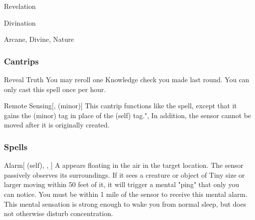 \newpage
\begin{spellsection}{Revelation}

\begin{spellheader}
\end{spellheader}


 Divination

 Arcane, Divine, Nature

\subsubsection{Cantrips}


\begin{freeability}{Reveal Truth}
You may reroll one Knowledge check you made last round.
You can only cast this spell once per hour.
\end{freeability}


\begin{freeability}{Remote Sensing}[,  (minor)]
This cantrip functions like the  spell, except that it gains the  (minor) tag in place of the  (self) tag.",
In addition, the sensor cannot be moved after it is originally created.
\end{freeability}

\end{spellsection}


\subsubsection{Spells}


\lowercase{\hypertarget{spell:Alarm}{}}\label{spell:Alarm}
\begin{attuneability}[Rank 1]{\hypertarget{spell:Alarm}{Alarm}}[ (self), , ]
A  appears floating in the air in the target location.
The sensor passively observes its surroundings.
If it sees a creature or object of Tiny size or larger moving within 50 feet of it, it will trigger a mental "ping" that only you can notice.
You must be within 1 mile of the sensor to receive this mental alarm.
This mental sensation is strong enough to wake you from normal sleep, but does not otherwise disturb concentration.
\end{attuneability}
\vspace{0.25em}



